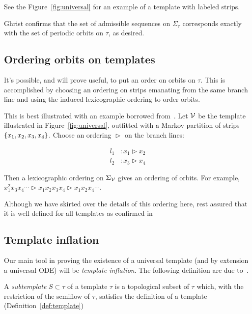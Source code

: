 \documentclass[paper.tex]{subfiles}
\begin{document}
See the Figure~\ref{fig:universal} for an example of a template with labeled strips.

Ghrist confirms that the set of admissible sequences on $\Sigma_\tau$ corresponds exactly with the set of periodic orbits on $\tau$, as desired.


\subsection{Ordering orbits on templates}

It's possible, and will prove useful, to put an order on orbits on $\tau$. This is accomplished by choosing an ordering on strips emanating from the same branch line and using the induced lexicographic ordering to
order orbits.

This is best illustrated with an example borrowed from~\cite{knottyode}. Let $\mathcal{V}$ be the template illustrated in Figure~\ref{fig:universal}, outfitted with a Markov partition of strips $\{ x_1, x_2, x_3, x_4 \}$.
Choose an ordering $\vartriangleright$ on the branch lines:

\begin{align}
  l_1 &: x_1 \vartriangleright x_2 \\
  l_2 &: x_3 \vartriangleright x_4
\end{align}

Then a lexicographic ordering on $\Sigma_{\mathcal{V}}$ gives an ordering of orbits. For example, $x_1^2 x_3 x_4 \cdots \vartriangleright x_1 x_2 x_3 x_4 \vartriangleright x_1 x_2 x_4 \cdots$.

Although we have skirted over the details of this ordering here, rest assured that it is well-defined for all templates as confirmed in~\cite{Holmes1989}\cite{Holmes1985}\cite{knottyode}


\subsection{Template inflation}

Our main tool in proving the existence of a universal template (and by extension a universal ODE) will be \emph{template inflation}. The following definition are due to~\cite{knottyode}.





\begin{definition}[Subtemplate]
  A \emph{subtemplate} $S \subset \tau$ of a template $\tau$ is a topological subset of $\tau$ which, with the restriction of the semiflow of $\tau$, satisfies the definition of a template (Definition~\ref{def:template})
\end{definition}
\end{document}
